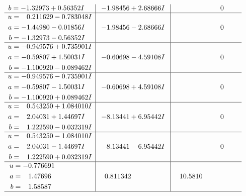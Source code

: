 \documentclass[1p]{elsarticle_modified}
\theoremstyle{definition}
\begin{document}
$$\begin{array}{c|c|c}
\begin{aligned}
b &= -1.32973 + 0.56352 I\end{aligned}
 & -1.98456 + 2.68666 I & \phantom{-0.000000 } 0 \\ \hline\begin{aligned}
u &= \phantom{-}0.211629 - 0.783048 I \\
a &= -1.44980 - 0.01856 I \\
b &= -1.32973 - 0.56352 I\end{aligned}
 & -1.98456 - 2.68666 I & \phantom{-0.000000 } 0 \\ \hline\begin{aligned}
u &= -0.949576 + 0.735901 I \\
a &= -0.59807 + 1.50031 I \\
b &= -1.100920 - 0.089462 I\end{aligned}
 & -0.60698 - 4.59108 I & \phantom{-0.000000 } 0 \\ \hline\begin{aligned}
u &= -0.949576 - 0.735901 I \\
a &= -0.59807 - 1.50031 I \\
b &= -1.100920 + 0.089462 I\end{aligned}
 & -0.60698 + 4.59108 I & \phantom{-0.000000 } 0 \\ \hline\begin{aligned}
u &= \phantom{-}0.543250 + 1.084010 I \\
a &= \phantom{-}2.04031 + 1.44697 I \\
b &= \phantom{-}1.222590 - 0.032319 I\end{aligned}
 & -8.13441 + 6.95442 I & \phantom{-0.000000 } 0 \\ \hline\begin{aligned}
u &= \phantom{-}0.543250 - 1.084010 I \\
a &= \phantom{-}2.04031 - 1.44697 I \\
b &= \phantom{-}1.222590 + 0.032319 I\end{aligned}
 & -8.13441 - 6.95442 I & \phantom{-0.000000 } 0 \\ \hline\begin{aligned}
u &= -0.776691\phantom{ +0.000000I} \\
a &= \phantom{-}1.47696\phantom{ +0.000000I} \\
b &= \phantom{-}1.58587\phantom{ +0.000000I}\end{aligned}
 & \phantom{-}0.811342\phantom{ +0.000000I} & \phantom{-}10.5810\phantom{ +0.000000I}\\
 \hline 
 \end{array}$$\newpage$$\begin{array}{c|c|c}  

\end{array}$$
\end{document}
